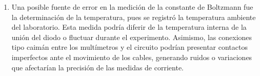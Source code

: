 \documentclass[twocolumn]{article} %
\begin{document}
\begin{enumerate}
    \item Una posible fuente de error en la medición de la constante de Boltzmann fue la determinación de la temperatura, pues se registró la temperatura ambiente del laboratorio. Esta medida podría diferir de la temperatura interna de la unión del diodo o fluctuar durante el experimento. Asimismo, las conexiones tipo caimán entre los multímetros y el circuito podrían presentar contactos imperfectos ante el movimiento de los cables, generando ruidos o variaciones que afectarían la precisión de las medidas de corriente.
\end{enumerate}





% 
% 









\end{document}
